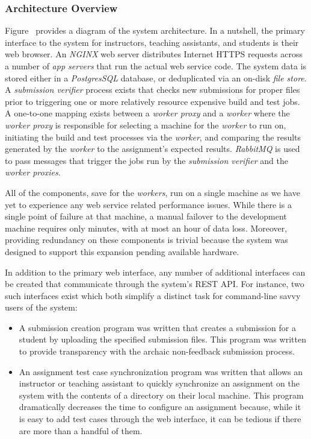 \subsubsection{Architecture Overview}
Figure~ provides a diagram of the system
architecture. In a nutshell, the primary interface to the system for
instructors, teaching assistants, and students is their web browser. An
\emph{NGINX} web server distributes Internet HTTPS requests across a number of
\emph{app servers} that run the actual web service code. The system data is
stored either in a \emph{PostgresSQL} database, or deduplicated via an on-disk
\emph{file store}. A \emph{submission verifier} process exists that checks new
submissions for proper files prior to triggering one or more relatively
resource expensive build and test jobs. A one-to-one mapping exists between a
\emph{worker proxy} and a \emph{worker} where the \emph{worker proxy} is
responsible for selecting a machine for the \emph{worker} to run on, initiating
the build and test processes via the \emph{worker}, and comparing the results
generated by the \emph{worker} to the assignment's expected
results. \emph{RabbitMQ} is used to pass messages that trigger the jobs run by
the \emph{submission verifier} and the \emph{worker proxies}.

All of the components, save for the \emph{workers}, run on a single machine as
we have yet to experience any web service related performance issues. While
there is a single point of failure at that machine, a manual failover to the
development machine requires only minutes, with at most an hour of data
loss. Moreover, providing redundancy on these components is trivial because the
system was designed to support this expansion pending available hardware.

In addition to the primary web interface, any number of additional interfaces
can be created that communicate through the system's REST API. For instance,
two such interfaces exist which both simplify a distinct task for command-line
savvy users of the system:

\begin{itemize}
\item A submission creation program was written that creates a submission for a
  student by uploading the specified submission files. This program was written
  to provide transparency with the archaic non-feedback submission process.
\item An assignment test case synchronization program was written that allows
  an instructor or teaching assistant to quickly synchronize an assignment on
  the system with the contents of a directory on their local machine. This
  program dramatically decreases the time to configure an assignment because,
  while it is easy to add test cases through the web interface, it can be
  tedious if there are more than a handful of them.
\end{itemize}
